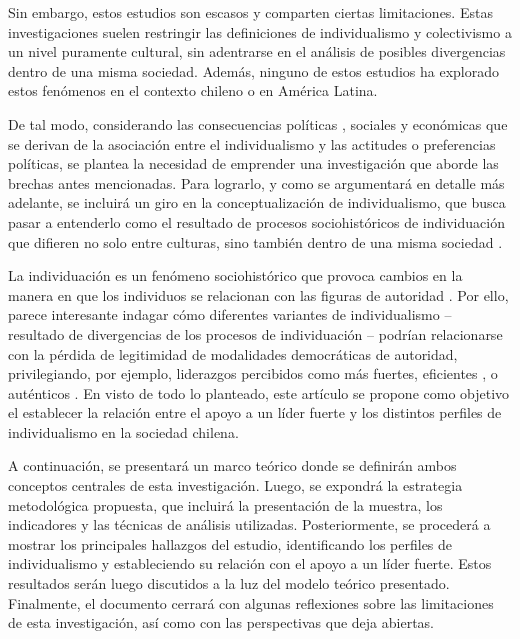 \documentclass[12pt,oneside]{templates/facsothesis}
\begin{document}
Sin embargo, estos estudios son escasos y comparten ciertas limitaciones. Estas investigaciones suelen restringir las definiciones de individualismo y colectivismo a un nivel puramente cultural, sin adentrarse en el análisis de posibles divergencias dentro de una misma sociedad. Además, ninguno de estos estudios ha explorado estos fenómenos en el contexto chileno o en América Latina.

De tal modo, considerando las consecuencias políticas \citep{zhang2009}, sociales \citep{strunk1999} y económicas \citep{kyriacou2016} que se derivan de la asociación entre el individualismo y las actitudes o preferencias políticas, se plantea la necesidad de emprender una investigación que aborde las brechas antes mencionadas. Para lograrlo, y como se argumentará en detalle más adelante, se incluirá un giro en la conceptualización de individualismo, que busca pasar a entenderlo como el resultado de procesos sociohistóricos de individuación que difieren no solo entre culturas, sino también dentro de una misma sociedad \citep{martuccelli2018}.

La individuación es un fenómeno sociohistórico que provoca cambios en la manera en que los individuos se relacionan con las figuras de autoridad \citep{araujo2021}. Por ello, parece interesante indagar cómo diferentes variantes de individualismo -- resultado de divergencias de los procesos de individuación -- podrían relacionarse con la pérdida de legitimidad de modalidades democráticas de autoridad, privilegiando, por ejemplo, liderazgos percibidos como más fuertes, eficientes \citep{araujo2022, araujo2022a}, o auténticos \citep{gauthier2021}. En visto de todo lo planteado, este artículo se propone como objetivo el establecer la relación entre el apoyo a un líder fuerte y los distintos perfiles de individualismo en la sociedad chilena.

A continuación, se presentará un marco teórico donde se definirán ambos conceptos centrales de esta investigación. Luego, se expondrá la estrategia metodológica propuesta, que incluirá la presentación de la muestra, los indicadores y las técnicas de análisis utilizadas. Posteriormente, se procederá a mostrar los principales hallazgos del estudio, identificando los perfiles de individualismo y estableciendo su relación con el apoyo a un líder fuerte. Estos resultados serán luego discutidos a la luz del modelo teórico presentado. Finalmente, el documento cerrará con algunas reflexiones sobre las limitaciones de esta investigación, así como con las perspectivas que deja abiertas.
\end{document}
